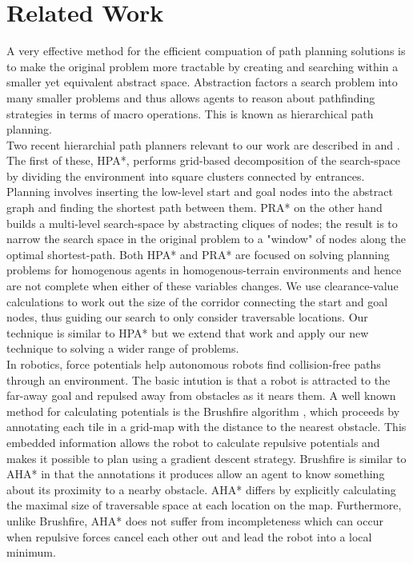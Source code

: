 \section{Related Work}
A very effective method for the efficient compuation of path planning solutions is to make the original problem more tractable by creating and searching within a smaller yet equivalent abstract space. Abstraction factors a search problem into many smaller problems and thus allows agents to reason about pathfinding strategies in terms of macro operations. This is known as hierarchical path planning. \\ \newline
Two recent hierarchial path planners relevant to our work are described in \cite{botea04} and \cite{sturtevant05}. The first of these, HPA*, performs grid-based decomposition of the search-space by dividing the environment into square clusters connected by entrances. Planning involves inserting the low-level start and goal nodes into the abstract graph and finding the shortest path between them. 
PRA* on the other hand builds a multi-level search-space by abstracting cliques of nodes; the result is to narrow the search space in the original problem to a "window" of nodes along the optimal shortest-path.\newline
Both HPA* and PRA* are focused on solving planning problems for homogenous agents in homogenous-terrain environments and hence are not complete when either of these variables changes. 
We use clearance-value calculations to work out the size of the corridor connecting the start and goal nodes, thus guiding our search to only consider traversable locations. 
Our technique is similar to HPA* but we extend that work and apply our new technique to solving a wider range of problems. \\
\medskip
In robotics, force potentials help autonomous robots find collision-free paths through an environment. The basic intution is that a robot is attracted to the far-away goal and repulsed away from obstacles as it nears them. A well known method for calculating potentials is the Brushfire algorithm \cite{latombe91}, which proceeds by annotating each tile in a grid-map with the distance to the nearest obstacle. This embedded information allows the robot to calculate repulsive potentials and makes it possible to plan using a gradient descent strategy. \newline
Brushfire is similar to AHA* in that the annotations it produces allow an agent to know something about its proximity to a nearby obstacle. AHA* differs by explicitly calculating the maximal size of traversable space at each location on the map. Furthermore, unlike Brushfire, AHA* does not suffer from incompleteness which can occur when repulsive forces cancel each other out and lead the robot into a local minimum. \\
